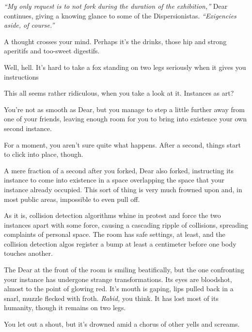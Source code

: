 \emph{``My only request is to not fork during the duration of the exhibition,''} Dear continues, giving a knowing glance to some of the Dispersionistas. \emph{``Exigencies aside, of course.''}

A thought crosses your mind. Perhaps it's the drinks, those hip and strong aperitifs and too-sweet digestifs.

\vfill

\newpage

\null
\vfill

Well, hell. It's hard to take a fox standing on two legs seriously when it gives you instructions

\vfill

\newpage
\null
\vfill

This all seems rather ridiculous, when you take a look at it. Instances as art?
\null
\vfill

\newpage
\null
\vfill

You're not as smooth as Dear, but you manage to step a little further away from one of your friends, leaving enough room for you to bring into existence your own second instance.
\null
\vfill

\newpage
For a moment, you aren't sure quite what happens. After a second, things start to click into place, though.

A mere fraction of a second after you forked, Dear also forked, instructing its instance to come into existence in a space overlapping the space that your instance already occupied. This sort of thing is very much frowned upon and, in most public areas, impossible to even pull off.

As it is, collision detection algorithms whine in protest and force the two instances apart with some force, causing a cascading ripple of collisions, spreading complaints of personal space. The room has safe settings, at least, and the collision detection algos register a bump at least a centimeter before one body touches another.

The Dear at the front of the room is smiling beatifically, but the one confronting your instance has undergone strange transformations. Its eyes are bloodshot, almost to the point of glowing red. It's mouth is gaping, lips pulled back in a snarl, muzzle flecked with froth. \emph{Rabid,} you think. It has lost most of its humanity, though it remains on two legs.

You let out a shout, but it's drowned amid a chorus of other yells and screams.


